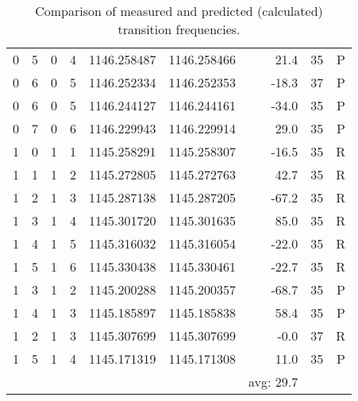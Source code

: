 \begin{table}
\begin{tabu}{rrrrrrrrr}
\rowfont{\color{blue}}0 & 5 & 0 & 4 & 1146.258487 & 1146.258466 & 21.4 & 35 & P\\
\rowfont{\color{blue}}0 & 6 & 0 & 5 & 1146.252334 & 1146.252353 & -18.3 & 37 & P\\
\rowfont{\color{blue}}0 & 6 & 0 & 5 & 1146.244127 & 1146.244161 & -34.0 & 35 & P\\
\rowfont{\color{blue}}0 & 7 & 0 & 6 & 1146.229943 & 1146.229914 & 29.0 & 35 & P\\
\rowfont{\color{red}}1 & 0 & 1 & 1 & 1145.258291 & 1145.258307 & -16.5 & 35 & R\\
\rowfont{\color{red}}1 & 1 & 1 & 2 & 1145.272805 & 1145.272763 & 42.7 & 35 & R\\
\rowfont{\color{red}}1 & 2 & 1 & 3 & 1145.287138 & 1145.287205 & -67.2 & 35 & R\\
\rowfont{\color{red}}1 & 3 & 1 & 4 & 1145.301720 & 1145.301635 & 85.0 & 35 & R\\
\rowfont{\color{red}}1 & 4 & 1 & 5 & 1145.316032 & 1145.316054 & -22.0 & 35 & R\\
\rowfont{\color{red}}1 & 5 & 1 & 6 & 1145.330438 & 1145.330461 & -22.7 & 35 & R\\
\rowfont{\color{blue}}1 & 3 & 1 & 2 & 1145.200288 & 1145.200357 & -68.7 & 35 & P\\
\rowfont{\color{blue}}1 & 4 & 1 & 3 & 1145.185897 & 1145.185838 & 58.4 & 35 & P\\
\rowfont{\color{red}}1 & 2 & 1 & 3 & 1145.307699 & 1145.307699 & -0.0 & 37 & R\\
\rowfont{\color{blue}}1 & 5 & 1 & 4 & 1145.171319 & 1145.171308 & 11.0 & 35 & P\\
\midrule
 &  &  &  &  &  &  avg: 29.7\\
\bottomrule
\end{tabu}\caption{Comparison of measured and predicted (calculated) transition frequencies.}\end{table}
